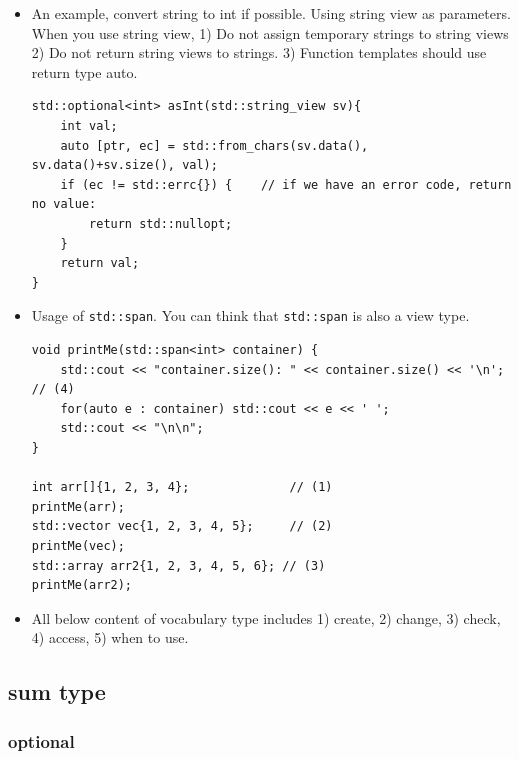 \documentclass[a4paper,11pt,twoside]{book}
\begin{document}

\begin{itemize}
	\item An example, convert string to int if possible.  Using string view as parameters. When you use string view, 1) Do not assign temporary strings to string views 2) Do not return string views to strings. 3) Function templates should use return type auto. 
\begin{lstlisting}
std::optional<int> asInt(std::string_view sv){
	int val;
	auto [ptr, ec] = std::from_chars(sv.data(), sv.data()+sv.size(), val);
	if (ec != std::errc{}) { 	// if we have an error code, return no value:
		return std::nullopt;
	}
	return val;
}	
\end{lstlisting}	
	
	\item Usage of \texttt{std::span}. You can think that \texttt{std::span} is also a view type.
\begin{lstlisting}
void printMe(std::span<int> container) {	
	std::cout << "container.size(): " << container.size() << '\n';  // (4)
	for(auto e : container) std::cout << e << ' ';
	std::cout << "\n\n";
}

int arr[]{1, 2, 3, 4};              // (1)
printMe(arr);
std::vector vec{1, 2, 3, 4, 5};     // (2)
printMe(vec);
std::array arr2{1, 2, 3, 4, 5, 6}; // (3)
printMe(arr2);		
\end{lstlisting}

	\item All below content of vocabulary type includes 1) create, 2) change, 3) check, 4) access, 5) when to use.

\end{itemize}


\subsection{sum type}
\subsubsection{optional}
\end{document}
